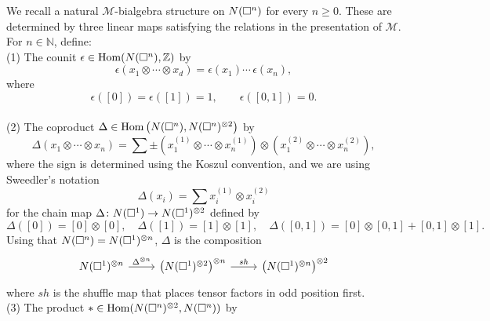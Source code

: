 We recall a natural $\mathcal M$-bialgebra structure on $N(\square^n)$ for every $n \geq 0$.
These are determined by three linear maps satisfying the relations in the presentation of $\mathcal M$.
For $n \in \mathbb{N}$, define: \vspace*{5pt} \\
(1) The counit $\epsilon \in \mathrm{Hom}(N(\square^n), \mathbb{Z})$ by
\begin{equation*}
\epsilon \left( x_1 \otimes \cdots \otimes x_d \right) = \epsilon(x_1) \cdots \, \epsilon(x_n),
\end{equation*}
where
\begin{equation*}
\epsilon([0]) = \epsilon([1]) = 1, \qquad \epsilon([0, 1]) = 0.
\end{equation*} \vspace*{-6pt} \\
(2) The coproduct $\Delta \in \mathrm{Hom} \left( N(\square^n), N(\square^n)^{\otimes 2} \right)$ by
\begin{equation*}	
\Delta (x_1 \otimes \cdots \otimes x_n) = 	
\sum \pm \left( x_1^{(1)} \otimes \cdots \otimes x_n^{(1)} \right) \otimes 	
\left( x_1^{(2)} \otimes \cdots \otimes x_n^{(2)} \right),	
\end{equation*}	
where the sign is determined using the Koszul convention, and we are using Sweedler's notation
\begin{equation*}	
\Delta(x_i) = \sum x_i^{(1)} \otimes x_i^{(2)}
\end{equation*}
for the chain map $\Delta \colon N(\square^1) \to N(\square^1)^{\otimes 2}$ defined by
\begin{equation*}
\Delta([0]) = [0] \otimes [0], \quad \Delta([1]) = [1] \otimes [1], \quad \Delta([0, 1]) = [0] \otimes [0, 1] + [0, 1] \otimes [1].
\end{equation*}
Using that $N(\square^n) = N(\square^1)^{\otimes n}$, $\Delta$ is the composition
\begin{equation*}
\begin{tikzcd}
\chains(\square^1)^{\otimes n} \arrow[r, "\Delta^{\otimes n}"] & \left( \chains(\square^1)^{\otimes 2}  \right)^{\otimes n} \arrow[r, "sh"] & \left( \chains(\square^1)^{\otimes n} \right)^{\otimes 2}
\end{tikzcd}
\end{equation*}
where $sh$ is the shuffle map that places tensor factors in odd position first. \vspace*{5pt} \\
(3) The product $\ast \in \mathrm{Hom}(N(\square^n)^{\otimes 2}, N(\square^n))$ by
